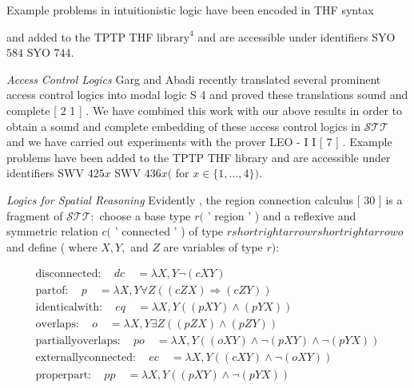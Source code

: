 \documentclass[10pt]{article}
\begin{document}
\hspace*{\fill}Example problems in intuitionistic logic have been encoded in THF syntax 

\noindent [ 1 5 ] and added to the TPTP THF  $ \mathrm{library} ^{ 4 }$  and are accessible under identifiers 
 SYO  $ 58  \hat{}  4 $  \quad SYO  $ 74  \hat{}  4  . $  

\noindent \textit{Access } \quad \textit{Control Logics } \quad Garg and Abadi recently translated several prominent 
 access control logics into modal logic S 4 and proved these translations sound 
 and complete [ 2 1 ] . We have combined this work with our above results in order 
 to obtain a sound and complete embedding of these access control logics in 
  $ \mathcal{STT} $  and we have carried out experiments with the prover LEO - I I [ 7 ] . Example 
 problems have been added to the TPTP THF library and are accessible under 
 identifiers SWV  $ 425 \hat{}{ x }$  \quad SWV  $ 436 \hat{}{ x }  ( $  for  $ x   \in   \{  1  ,   .   .   .   ,   4  \}  )  . $  

\noindent \textit{Logics for Spatial Reasoning } Evidently , the region connection calculus [ 30 ] is a 
 fragment of  $ \mathcal{STT}  : $  choose a base type  $ r   ( $  ' region ' ) and a reflexive and symmetric 
 relation  $ c   ( $  ' connected ' ) of type  $ r   shortrightarrow   r   shortrightarrow   o $  and define ( where  $ X  ,   Y  , $  and  $ Z $  are 
 variables of type  $ r  )  : $  

\[\begin{aligned} \mathrm{disconnected}   :  \quad  dc  \quad  =   \lambda  X  ,   Y   \neg  (  c   X   Y  ) \\
  \mathrm{part}   \mathrm{of}   :  \quad  p  \quad  =   \lambda  X  ,   Y   \forall  Z   (  (  c   Z   X  )   \Rightarrow   (  c   Z   Y  )  ) \\
  \mathrm{identical}   \mathrm{with}   :  \quad  eq  \quad  =   \lambda  X  ,   Y   (  (  p   X   Y  )   \wedge   (  p   Y   X  )  ) \\
  \mathrm{overlaps}   :  \quad  o  \quad  =   \lambda  X  ,   Y   \exists  Z   (  (  p   Z   X  )   \wedge   (  p   Z   Y  )  ) \\
  \mathrm{partially}   \mathrm{overlaps}   :  \quad  po  \quad  =   \lambda  X  ,   Y   (  (  o   X   Y  )   \wedge   \neg  (  p   X   Y  )   \wedge   \neg  (  p   Y   X  )  ) \\
  \mathrm{externally}   \mathrm{connected}   :  \quad  ec  \quad  =   \lambda  X  ,   Y   (  (  c   X   Y  )   \wedge   \neg  (  o   X   Y  )  ) \\
  \mathrm{proper}   \mathrm{part}   :  \quad  pp  \quad  =   \lambda  X  ,   Y   (  (  p   X   Y  )   \wedge   \neg  (  p   Y   X  )  ) \end{aligned}\]
\end{document}

